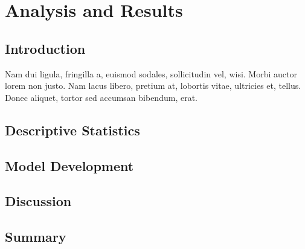 
\chapter{Analysis and Results}\doublespacing %

\label{Chapter5} %





\section{Introduction}
Nam dui ligula, fringilla a, euismod sodales, sollicitudin vel, wisi. Morbi auctor lorem non justo. Nam lacus libero, pretium at, lobortis vitae, ultricies et, tellus. Donec aliquet, tortor sed accumsan bibendum, erat.


\section{Descriptive Statistics}
\lipsum[2]



\section{Model Development}
\lipsum[2]



\section{Discussion}
\lipsum[1]


\section{Summary}
\lipsum[3]






